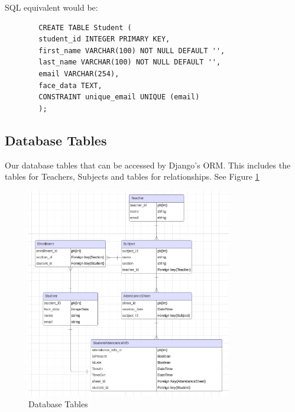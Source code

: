 	SQL equivalent would be:
	\begin{verbatim}
		CREATE TABLE Student (
		student_id INTEGER PRIMARY KEY,
		first_name VARCHAR(100) NOT NULL DEFAULT '',
		last_name VARCHAR(100) NOT NULL DEFAULT '',
		email VARCHAR(254),
		face_data TEXT,
		CONSTRAINT unique_email UNIQUE (email)
		);
	\end{verbatim}
\subsection{Database Tables}
	Our database tables that can be accessed by Django's ORM. This includes the tables for Teachers, Subjects and tables for relationships. See Figure
	\ref{fig:dbtables}
	\begin{figure}[h] %
		\centering
		\includegraphics[width=0.8\textwidth]{figures/chapter4/dbtables.png} %
		\caption{Database Tables}
		\label{fig:dbtables}
	\end{figure}	
	
